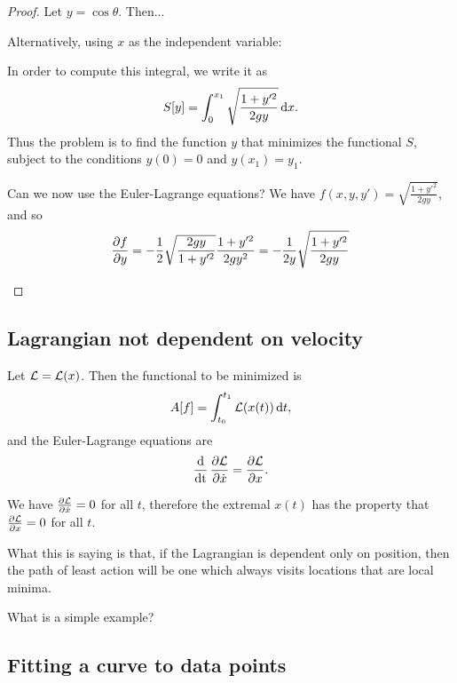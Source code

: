 \begin{proof}
  Let $y = \cos \theta$. Then...


  Alternatively, using $x$ as the independent variable:
  \begin{mdframed}
    In order to compute this integral, we write it as
    \begin{align*}
    S[y] = \int_{0}^{x_1} \sqrt{\frac{1 + y'^2}{2gy}}\dx.
  \end{align*}
  Thus the problem is to find the function $y$ that minimizes the functional $S$, subject to the
  conditions $y(0) = 0$ and $y(x_1) = y_1$.

  Can we now use the Euler-Lagrange equations? We have $f(x, y, y') = \sqrt{\frac{1 + y'^2}{2gy}}$, and so
  \begin{align*}
    \frac{\partial f}{\partial y} = -\frac{1}{2}\sqrt{\frac{2gy}{1 + y'^2}}\frac{1 + y'^2}{2gy^2} = -\frac{1}{2y}\sqrt{\frac{1 + y'^2}{2gy}}
  \end{align*}
\end{mdframed}

\end{proof}






\subsection{Lagrangian not dependent on velocity}

Let $\mathcal{L} = \mathcal{L}(x)$. Then the functional to be minimized is
\begin{align*}
  A[f] = \int_{t_{0}}^{t_{1}} \Lag(x(t)) \dt,
\end{align*}
and the Euler-Lagrange equations are
\begin{align*}
  \operatorname{\frac{\text{d}}{\text{dt}}} \frac{\partial \mathcal{L}}{\partial \dot{x}} = \frac{\partial \mathcal{L}}{\partial x}.
\end{align*}

We have $\frac{\partial \mathcal{L}}{\partial \dot{x}} = 0$ for all $t$, therefore the extremal $x(t)$ has the property that $\frac{\partial \mathcal{L}}{\partial x} = 0$ for all $t$.

What this is saying is that, if the Lagrangian is dependent only on position, then the path of least action
will be one which always visits locations that are local minima.

What is a simple example?



\subsection{Fitting a curve to data points}

